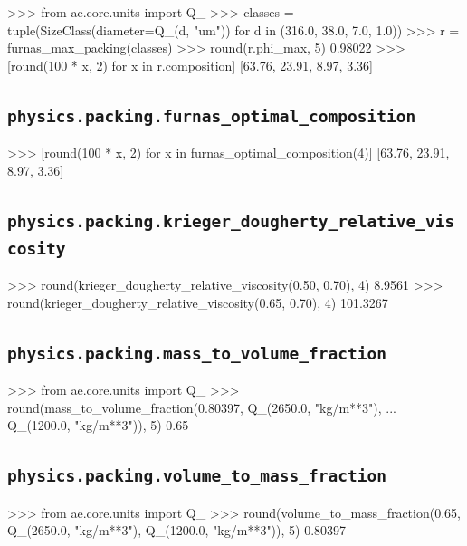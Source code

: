 \documentclass[10pt,a4paper,twoside]{report}
\begin{document}
\begin{doctestblock}
>>> from ae.core.units import Q_
>>> classes = tuple(SizeClass(diameter=Q_(d, "um")) for d in (316.0, 38.0, 7.0, 1.0))
>>> r = furnas_max_packing(classes)
>>> round(r.phi_max, 5)
0.98022
>>> [round(100 * x, 2) for x in r.composition]
[63.76, 23.91, 8.97, 3.36]
\end{doctestblock}

\subsection*{\texttt{physics.packing.furnas\_optimal\_composition}}

\begin{doctestblock}
>>> [round(100 * x, 2) for x in furnas_optimal_composition(4)]
[63.76, 23.91, 8.97, 3.36]
\end{doctestblock}

\subsection*{\texttt{physics.packing.krieger\_dougherty\_relative\_viscosity}}

\begin{doctestblock}
>>> round(krieger_dougherty_relative_viscosity(0.50, 0.70), 4)
8.9561
>>> round(krieger_dougherty_relative_viscosity(0.65, 0.70), 4)
101.3267
\end{doctestblock}

\subsection*{\texttt{physics.packing.mass\_to\_volume\_fraction}}

\begin{doctestblock}
>>> from ae.core.units import Q_
>>> round(mass_to_volume_fraction(0.80397, Q_(2650.0, "kg/m**3"),
...                               Q_(1200.0, "kg/m**3")), 5)
0.65
\end{doctestblock}

\subsection*{\texttt{physics.packing.volume\_to\_mass\_fraction}}

\begin{doctestblock}
>>> from ae.core.units import Q_
>>> round(volume_to_mass_fraction(0.65, Q_(2650.0, "kg/m**3"), Q_(1200.0, "kg/m**3")), 5)
0.80397
\end{doctestblock}
\end{document}
